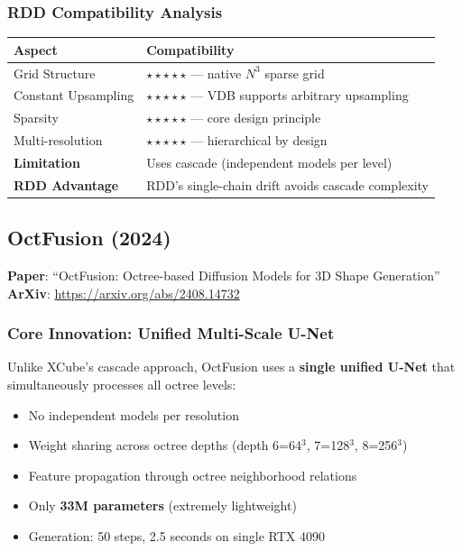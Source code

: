 \documentclass[11pt, a4paper]{article}
\begin{document}
\subsubsection{RDD Compatibility Analysis}

\begin{center}
\begin{tabular}{ll}
\toprule
Aspect & Compatibility \\
\midrule
Grid Structure & $\star\star\star\star\star$ --- native $N^3$ sparse grid \\
Constant Upsampling & $\star\star\star\star\star$ --- VDB supports arbitrary upsampling \\
Sparsity & $\star\star\star\star\star$ --- core design principle \\
Multi-resolution & $\star\star\star\star\star$ --- hierarchical by design \\
\midrule
\textbf{Limitation} & Uses cascade (independent models per level) \\
\textbf{RDD Advantage} & RDD's single-chain drift avoids cascade complexity \\
\bottomrule
\end{tabular}
\end{center}

\subsection{OctFusion (2024)}

\textbf{Paper}: ``OctFusion: Octree-based Diffusion Models for 3D Shape Generation''\\
\textbf{ArXiv}: \url{https://arxiv.org/abs/2408.14732}

\subsubsection{Core Innovation: Unified Multi-Scale U-Net}

Unlike XCube's cascade approach, OctFusion uses a \textbf{single unified U-Net} that simultaneously processes all octree levels:

\begin{itemize}
    \item No independent models per resolution
    \item Weight sharing across octree depths (depth 6=64$^3$, 7=128$^3$, 8=256$^3$)
    \item Feature propagation through octree neighborhood relations
    \item Only \textbf{33M parameters} (extremely lightweight)
    \item Generation: 50 steps, 2.5 seconds on single RTX 4090
\end{itemize}
\end{document}
